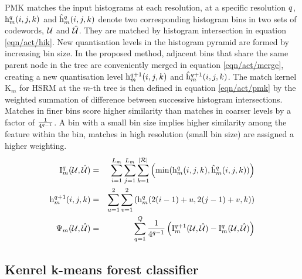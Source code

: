 PMK matches the input histograms at each resolution, at a specific resolution $q$, $\mathrm{h}^q_{m}(i,j,k)$ and $\mathrm{\hat{h}}^q_{m}(i,j,k)$ denote two corresponding histogram bins in two sets of codewords, $\mathcal{U}$ and $\mathcal{\hat{U}}$. They are matched by histogram intersection in equation \ref{eqn/act/hik}. New quantisation levels in the histogram pyramid are formed by increasing bin size. In the proposed method, adjacent bins that share the same parent node in the tree are conveniently merged in equation \ref{eqn/act/merge}, creating a new quantisation level $\mathrm{h}^{q+1}_m(i,j,k)$ and $\mathrm{\hat{h}}^{q+1}_m(i,j,k)$. The match kernel $\mathrm{K}_m$ for HSRM at the $m$-th tree is then defined in equation \ref{eqn/act/pmk} by the weighted summation of difference between successive histogram intersections. Matches in finer bins score higher similarity than matches in coarser levels by a factor of $\frac{1}{4^{q-1}}$. A bin with a small bin size implies higher similarity among the feature within the bin, matches in high resolution (small bin size) are assigned a higher weighting.  
\begin{align}
	\label{eqn/act/hik}
	\mathrm{I}_{m}^q(\mathcal{U},\mathcal{\hat{U}}) &= & \displaystyle\sum_{i=1}^{L_m}\sum_{j=1}^{L_m}\sum_{k=1}^{|\mathcal{R}|} \left( \min(\mathrm{h}^{q}_m(i,j,k), \mathrm{\hat{h}}^{q}_m(i,j,k)) \right)\\
	\label{eqn/act/merge}
	\mathrm{h}^{q+1}_m(i,j,k) &= & \displaystyle\sum_{u=1}^{2}\sum_{v=1}^{2} \left( \mathrm{h}^{q}_m(2(i-1)+u,2(j-1)+v,k) \right)\\
	\label{eqn/act/pmk}
	\Psi_m(\mathcal{U},\mathcal{\hat{U}}) &= & \displaystyle\sum_{q = 1}^{Q}\frac{1}{4^{q-1}} \left( \mathrm{I}_{m}^{q+1}(\mathcal{U},\mathcal{\hat{U}}) - \mathrm{I}_{m}^{q}(\mathcal{U},\mathcal{\hat{U}}) \right)
\end{align}

\subsection{Kenrel k-means forest classifier}

